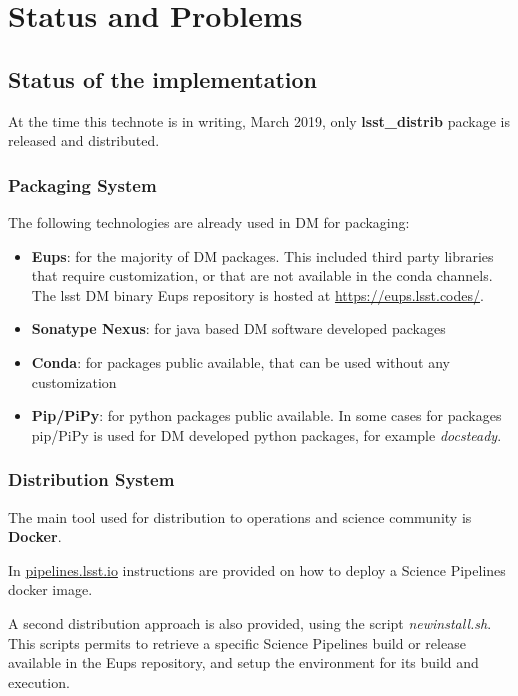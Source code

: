 \section{Status and Problems} \label{sec:statusAndProblems}

\subsection{Status of the implementation} \label{sec:status}

At the time this technote is in writing, March 2019, only \textbf{lsst\_distrib} package is released and distributed.


\subsubsection{Packaging System} \label{sec:statusPkgs}

The following technologies are already used in DM for packaging:

\begin{itemize}
\item {\bf Eups}: for the majority of DM packages. This included third party libraries that require customization, or that are not available in the conda channels. The lsst DM binary Eups repository is hosted at \url{https://eups.lsst.codes/}. 
\item {\bf Sonatype Nexus}: for java based DM software developed packages
\item {\bf Conda}: for packages public available, that can be used without any customization
\item {\bf Pip/PiPy}: for python packages public available. In some cases for packages pip/PiPy is used for DM developed python packages, for example \textit{docsteady}.
\end{itemize}


\subsubsection{Distribution System} \label{sec:statusDistrib}

The main tool used for distribution to operations and science community is \textbf{Docker}. 

In \url{pipelines.lsst.io} instructions are provided on how to deploy a Science Pipelines docker image.

A second distribution approach is also provided, using the script \textit{newinstall.sh}. 
This scripts permits to retrieve a specific Science Pipelines build or release available in the Eups repository, and setup the environment for its build and execution.


